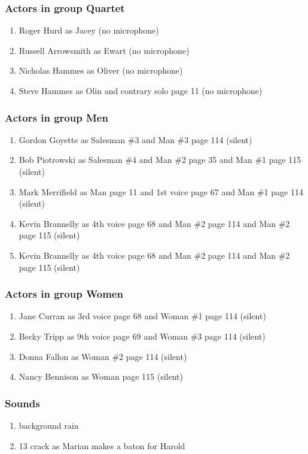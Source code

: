 \subsubsection{Actors in group Quartet}
\begin{enumerate}
\item Roger Hurd as Jacey (no microphone)
\item Russell Arrowsmith as Ewart (no microphone)
\item Nicholas Hammes as Oliver (no microphone)
\item Steve Hammes as Olin and contrary solo page 11 (no microphone)
\end{enumerate}
\subsubsection{Actors in group Men}
\begin{enumerate}
\item Gordon Goyette as Salesman \#3 and Man \#3 page 114 (silent)
\item Bob Piotrowski as Salesman \#4 and Man \#2 page 35 and Man \#1 page 115 (silent)
\item Mark Merrifield as Man page 11 and 1st voice page 67 and Man \#1 page 114 (silent)
\item Kevin Brannelly as 4th voice page 68 and Man \#2 page 114 and Man \#2 page 115 (silent)
\item Kevin Brannelly as 4th voice page 68 and Man \#2 page 114 and Man \#2 page 115 (silent)
\end{enumerate}
\subsubsection{Actors in group Women}
\begin{enumerate}
\item Jane Curran as 3rd voice page 68 and Woman \#1 page 114 (silent)
\item Becky Tripp as 9th voice page 69 and Woman \#3 page 114 (silent)
\item Donna Fallon as Woman \#2 page 114 (silent)
\item Nancy Bennison as Woman page 115 (silent)
\end{enumerate}

\subsubsection{Sounds}
\begin{enumerate}
\item background rain
\item 13 crack as Marian makes a baton for Harold
\end{enumerate}
